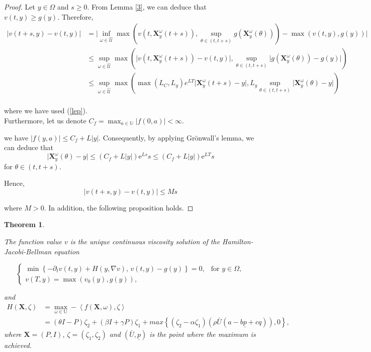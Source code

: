 \documentclass[]{interact}
\theoremstyle{plain}%
\newtheorem{theorem}{Theorem}[section]
\theoremstyle{definition}
\theoremstyle{remark}
\begin{document}
\begin{proof}
Let $y \in \Omega$ and $s \geq 0$. From Lemma \ref{3}, we can deduce that $v(t, y) \geq g(y)$.
Therefore,
$$
\begin{aligned}
	\lvert v(t+s, y)-v(t, y) \rvert  &= \lvert \inf_{\omega\in \hat{\mathcal{U}}}\max \left(v\left(t,\mathbf{X}_y^\omega(t+s)\right), \sup_{\theta \in(t,t+s)} g\left(\mathbf{X}_y^\omega(\theta)\right)\right)- \max \left( v(t, y), g(y)  \right)  \rvert  \\
	& \leq \sup_{\omega\in \hat{\mathcal{U}}}\max \left( \lvert  v\left(t,\mathbf{X}_y^\omega(t+s)\right) - v(t, y) \rvert ,    \sup_{\theta \in(t,t+s)}\lvert  g\left(\mathbf{X}_y^\omega(\theta)\right) -g(y)  \rvert  \right)  \\
	&  \leq \sup_{\omega\in \hat{\mathcal{U}}} \max \left( \max \left(L_C, L_g \right) e^{L T} \lvert \mathbf{X}_y^\omega(t+s)-y   \lvert , L_g \sup_{\theta \in(t,t+s)} \lvert\mathbf{X}_y^\omega(\theta) -y  \rvert  \right)  \\
\end{aligned}
$$

where we have used (\ref{lep}).\\

Furthermore, let us denote $ C_f = \max _{a \in \mathbb{U}} \lvert f(0, a) \lvert<\infty$.

we have $ \lvert f(y, a)\rvert \leq C_f+L \lvert y \lvert$. Consequently, by applying Grönwall's lemma, we can deduce that $$\lvert \mathbf{X}_y^\omega(\theta)-y\rvert \leq\left(C_f+L \lvert y \lvert\right) \mathrm{e}^{L s} s \leq \left(C_f+L \lvert y \lvert\right) \mathrm{e}^{L T} s$$ for $\theta \in (t, t+s)$.

Hence,
\[\lvert v(t+s, y)-v(t, y) \rvert \leq M s \]

where $ M> 0$. In addition, the following proposition holds.
\end{proof}

\begin{theorem}\label{main}
	
The function value $v$ is the unique continuous viscosity solution of the Hamilton-Jacobi-Bellman equation 

\begin{equation} \label{HJB}
\begin{cases}
    \min \left\{ -\partial_{t} v(t,y) + H(y, \nabla v), \, v(t, y) - g(y) \right\} = 0, & \text{for } y \in \Omega, \\
    v(T,y) = \max(v_{0}(y), g(y)),
\end{cases}
\end{equation}


and
\begin{align*}
	H(\mathbf{X}, \zeta) & = \max_{\omega \in \mathbb{U}} - \left\langle f(\mathbf{X},\omega),\zeta \right\rangle \\
	& =  (\theta I - P)    \zeta_2 + (\beta I + \gamma P )  \zeta_1  + max \left\{ (\zeta_2 - \alpha \zeta_1) (\rho \bar{U} (a-b \underline{p} +cq)), 0 \right\},               
\end{align*}
where $  \mathbf{X}=(P, I) $, $\zeta= (\zeta_1, \zeta_2)$ and $(\bar{U},\underline{p})$ is the point where the maximum is achieved.

\end{theorem}
\end{document}
